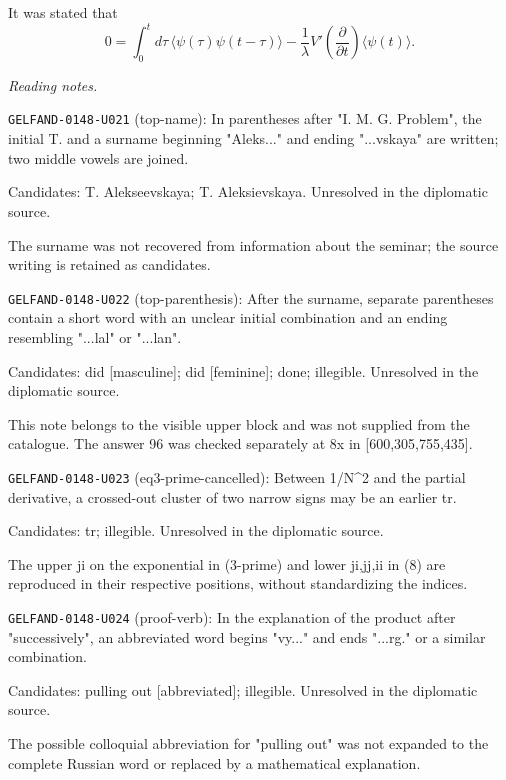 It was stated that
\begin{equation*}
0=\int_0^t d\tau\,\langle\psi(\tau)\psi(t-\tau)\rangle
-\frac1\lambda V'\left(\frac{\partial}{\partial t}\right)\langle\psi(t)\rangle. \tag{10}
\end{equation*}


\par\smallskip\noindent\textit{Reading notes.}\par
\noindent\texttt{GELFAND-0148-U021} (top-name): In parentheses after "I. M. G. Problem", the initial T. and a surname beginning "Aleks..." and ending "...vskaya" are written; two middle vowels are joined.\par
Candidates: T. Alekseevskaya; T. Aleksievskaya. Unresolved in the diplomatic source.\par
The surname was not recovered from information about the seminar; the source writing is retained as candidates.\par
\noindent\texttt{GELFAND-0148-U022} (top-parenthesis): After the surname, separate parentheses contain a short word with an unclear initial combination and an ending resembling "...lal" or "...lan".\par
Candidates: did [masculine]; did [feminine]; done; illegible. Unresolved in the diplomatic source.\par
This note belongs to the visible upper block and was not supplied from the catalogue. The answer 96 was checked separately at 8x in [600,305,755,435].\par
\noindent\texttt{GELFAND-0148-U023} (eq3-prime-cancelled): Between 1/N\textasciicircum{}2 and the partial derivative, a crossed-out cluster of two narrow signs may be an earlier tr.\par
Candidates: tr; illegible. Unresolved in the diplomatic source.\par
The upper ji on the exponential in (3-prime) and lower ji,jj,ii in (8) are reproduced in their respective positions, without standardizing the indices.\par
\noindent\texttt{GELFAND-0148-U024} (proof-verb): In the explanation of the product after "successively", an abbreviated word begins "vy..." and ends "...rg." or a similar combination.\par
Candidates: pulling out [abbreviated]; illegible. Unresolved in the diplomatic source.\par
The possible colloquial abbreviation for "pulling out" was not expanded to the complete Russian word or replaced by a mathematical explanation.\par


